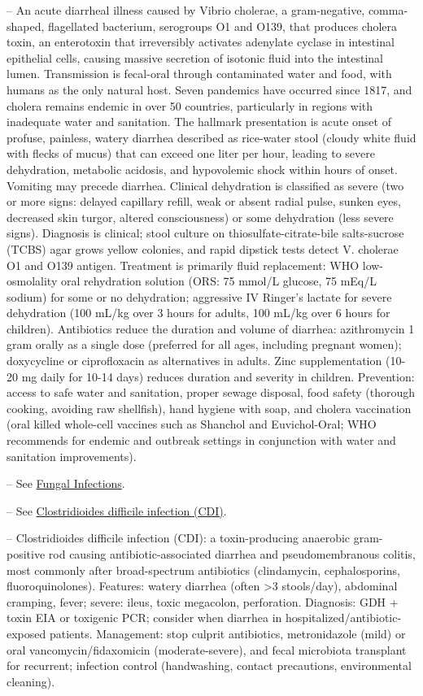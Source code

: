 -- An acute diarrheal illness caused by Vibrio cholerae, a gram-negative, comma-shaped, flagellated bacterium, serogroups O1 and O139, that produces cholera toxin, an enterotoxin that irreversibly activates adenylate cyclase in intestinal epithelial cells, causing massive secretion of isotonic fluid into the intestinal lumen. Transmission is fecal-oral through contaminated water and food, with humans as the only natural host. Seven pandemics have occurred since 1817, and cholera remains endemic in over 50 countries, particularly in regions with inadequate water and sanitation. The hallmark presentation is acute onset of profuse, painless, watery diarrhea described as rice-water stool (cloudy white fluid with flecks of mucus) that can exceed one liter per hour, leading to severe dehydration, metabolic acidosis, and hypovolemic shock within hours of onset. Vomiting may precede diarrhea. Clinical dehydration is classified as severe (two or more signs: delayed capillary refill, weak or absent radial pulse, sunken eyes, decreased skin turgor, altered consciousness) or some dehydration (less severe signs). Diagnosis is clinical; stool culture on thiosulfate-citrate-bile salts-sucrose (TCBS) agar grows yellow colonies, and rapid dipstick tests detect V. cholerae O1 and O139 antigen. Treatment is primarily fluid replacement: WHO low-osmolality oral rehydration solution (ORS: 75 mmol/L glucose, 75 mEq/L sodium) for some or no dehydration; aggressive IV Ringer’s lactate for severe dehydration (100 mL/kg over 3 hours for adults, 100 mL/kg over 6 hours for children). Antibiotics reduce the duration and volume of diarrhea: azithromycin 1 gram orally as a single dose (preferred for all ages, including pregnant women); doxycycline or ciprofloxacin as alternatives in adults. Zinc supplementation (10-20 mg daily for 10-14 days) reduces duration and severity in children. Prevention: access to safe water and sanitation, proper sewage disposal, food safety (thorough cooking, avoiding raw shellfish), hand hygiene with soap, and cholera vaccination (oral killed whole-cell vaccines such as Shanchol and Euvichol-Oral; WHO recommends for endemic and outbreak settings in conjunction with water and sanitation improvements).

-- See \hyperlink{Fungal Infections}{Fungal Infections}.

-- See \hyperlink{Clostridium Difficile}{Clostridioides difficile infection (CDI)}.

-- Clostridioides difficile infection (CDI): a toxin-producing anaerobic gram-positive rod causing antibiotic-associated diarrhea and pseudomembranous colitis, most commonly after broad-spectrum antibiotics (clindamycin, cephalosporins, fluoroquinolones). Features: watery diarrhea (often >3 stools/day), abdominal cramping, fever; severe: ileus, toxic megacolon, perforation. Diagnosis: GDH + toxin EIA or toxigenic PCR; consider when diarrhea in hospitalized/antibiotic-exposed patients. Management: stop culprit antibiotics, metronidazole (mild) or oral vancomycin/fidaxomicin (moderate-severe), and fecal microbiota transplant for recurrent; infection control (handwashing, contact precautions, environmental cleaning).

